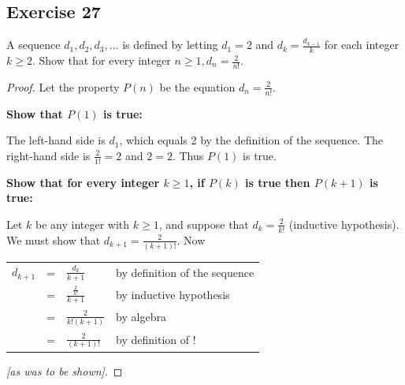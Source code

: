 \documentclass[14pt]{extarticle}
\newcommand{\dps}{\displaystyle}
\newcommand{\cy}{\color{cyan}}
\begin{document}
\subsection{Exercise 27}
A sequence $d_1, d_2, d_3, \ldots$ is defined by letting $d_1 = 2$ and $\dps d_k = \frac{d_{k-1}}{k}$ for each integer $k \geq 2$. Show that for every integer $\dps n \geq 1, d_n = \frac{2}{n!}$. 

\begin{proof}
Let the property $P(n)$ be the equation $\dps d_n = \frac{2}{n!}$. 

{\bf Show that $P(1)$ is true:} 

The left-hand side is $d_1$, which equals 2 by the definition of the sequence. The right-hand side is $\dps \frac{2}{1!} = 2$ and $2 = 2$. Thus $P(1)$ is true. 

{\bf Show that for every integer $k \geq 1$, if $P(k)$ is true then $P(k + 1)$ is true:} 

Let $k$ be any integer with $k \geq 1$, and suppose that $\dps d_k = \frac{2}{k!}$ ({\cy inductive hypothesis}). We must show that $\dps d_{k + 1} = \frac{2}{(k + 1)!}$. Now

\begin{center}
\begin{tabular}{rlll}
\vspace{0.3cm}
$d_{k+1}$ & = & $\dps \frac{d_k}{k+1}$ & {\cy by definition of the sequence} \\
\vspace{0.3cm}
& = & $\dps \frac{\frac{2}{k!}}{k+1}$ & {\cy by inductive hypothesis} \\
& = & $\dps \frac{2}{k!(k+1)}$ & {\cy by algebra} \\
& = & $\dps \frac{2}{(k + 1)!}$ & {\cy by definition of !}
\end{tabular}
\end{center}

{\it [as was to be shown]}.
\end{proof}
\end{document}
